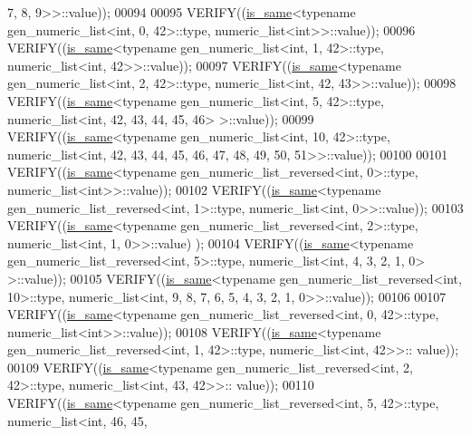 \begin{DoxyCode}
       7, 8, 9>>::value));
00094 
00095   VERIFY((\hyperlink{struct_eigen_1_1internal_1_1is__same}{is\_same}<\textcolor{keyword}{typename} gen\_numeric\_list<int, 0, 42>::type, numeric\_list<int>>::value));
00096   VERIFY((\hyperlink{struct_eigen_1_1internal_1_1is__same}{is\_same}<\textcolor{keyword}{typename} gen\_numeric\_list<int, 1, 42>::type, numeric\_list<int, 42>>::value));
00097   VERIFY((\hyperlink{struct_eigen_1_1internal_1_1is__same}{is\_same}<\textcolor{keyword}{typename} gen\_numeric\_list<int, 2, 42>::type, numeric\_list<int, 42, 43>>::value));
00098   VERIFY((\hyperlink{struct_eigen_1_1internal_1_1is__same}{is\_same}<\textcolor{keyword}{typename} gen\_numeric\_list<int, 5, 42>::type, numeric\_list<int, 42, 43, 44, 45, 46>
      >::value));
00099   VERIFY((\hyperlink{struct_eigen_1_1internal_1_1is__same}{is\_same}<\textcolor{keyword}{typename} gen\_numeric\_list<int, 10, 42>::type, numeric\_list<int, 42, 43, 44, 45,
       46, 47, 48, 49, 50, 51>>::value));
00100 
00101   VERIFY((\hyperlink{struct_eigen_1_1internal_1_1is__same}{is\_same}<\textcolor{keyword}{typename} gen\_numeric\_list\_reversed<int, 0>::type, numeric\_list<int>>::value));
00102   VERIFY((\hyperlink{struct_eigen_1_1internal_1_1is__same}{is\_same}<\textcolor{keyword}{typename} gen\_numeric\_list\_reversed<int, 1>::type, numeric\_list<int, 0>>::value));
00103   VERIFY((\hyperlink{struct_eigen_1_1internal_1_1is__same}{is\_same}<\textcolor{keyword}{typename} gen\_numeric\_list\_reversed<int, 2>::type, numeric\_list<int, 1, 0>>::value)
      );
00104   VERIFY((\hyperlink{struct_eigen_1_1internal_1_1is__same}{is\_same}<\textcolor{keyword}{typename} gen\_numeric\_list\_reversed<int, 5>::type, numeric\_list<int, 4, 3, 2, 1, 0>
      >::value));
00105   VERIFY((\hyperlink{struct_eigen_1_1internal_1_1is__same}{is\_same}<\textcolor{keyword}{typename} gen\_numeric\_list\_reversed<int, 10>::type, numeric\_list<int, 9, 8, 7, 6,
       5, 4, 3, 2, 1, 0>>::value));
00106 
00107   VERIFY((\hyperlink{struct_eigen_1_1internal_1_1is__same}{is\_same}<\textcolor{keyword}{typename} gen\_numeric\_list\_reversed<int, 0, 42>::type, numeric\_list<int>>::value));
00108   VERIFY((\hyperlink{struct_eigen_1_1internal_1_1is__same}{is\_same}<\textcolor{keyword}{typename} gen\_numeric\_list\_reversed<int, 1, 42>::type, numeric\_list<int, 42>>::
      value));
00109   VERIFY((\hyperlink{struct_eigen_1_1internal_1_1is__same}{is\_same}<\textcolor{keyword}{typename} gen\_numeric\_list\_reversed<int, 2, 42>::type, numeric\_list<int, 43, 42>>::
      value));
00110   VERIFY((\hyperlink{struct_eigen_1_1internal_1_1is__same}{is\_same}<\textcolor{keyword}{typename} gen\_numeric\_list\_reversed<int, 5, 42>::type, numeric\_list<int, 46, 45,

\end{DoxyCode}
